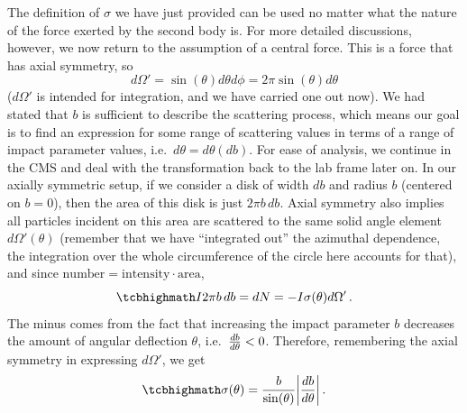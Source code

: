 \documentclass[../class_mech_main.tex]{subfiles}
\begin{document}


The definition of $\sigma$ we have just provided can be used no matter what the nature of the force exerted by the second body is. For more detailed discussions, however, we now return to the assumption of a central force. This is a force that has axial symmetry, so
\begin{equation}
	d\Omega' = \sin(\theta) d\theta d\phi = 2\pi \sin(\theta) d\theta
\end{equation}
($d\Omega'$ is intended for integration, and we have carried one out now). We had stated that $b$ is sufficient to describe the scattering process, which means our goal is to find an expression for some range of scattering values in terms of a range of impact parameter values, i.e.~$d\theta = d\theta(db)$. For ease of analysis, we continue in the CMS and deal with the transformation back to the lab frame later on. In our axially symmetric setup, if we consider a disk of width $db$ and radius $b$ (centered on $b = 0$), then the area of this disk is just $2\pi b \, db$. Axial symmetry also implies all particles incident on this area are scattered to the same solid angle element $d\Omega'(\theta)$ (remember that we have \enquote{integrated out} the azimuthal dependence, the integration over the whole circumference of the circle here accounts for that), and since $\mathrm{number} = \mathrm{intensity} \cdot \mathrm{area}$,
\begin{equation}
	\eqbox{
		I 2\pi b \, db = dN = - I \sigma(\theta) d\Omega' %
	} \, .
\end{equation}
The minus comes from the fact that increasing the impact parameter $b$ decreases the amount of angular deflection $\theta$, i.e.~$\dv{b}{\theta} < 0$. Therefore, remembering the axial symmetry in expressing $d\Omega'$, we get
\begin{equation}\label{eq:cross_section_cms_2}
	\eqbox{
		\sigma(\theta) = \frac{b}{\sin(\theta)} \abs{\dv{b}{\theta}}
	} \, .
\end{equation}
\end{document}
